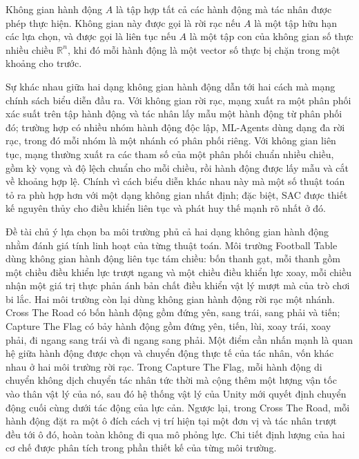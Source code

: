 \begin{dn}
\label{dn:action}
Không gian hành động $A$ là tập hợp tất cả các hành động mà tác nhân được phép thực
hiện. Không gian này được gọi là rời rạc nếu $A$ là một tập hữu hạn các lựa
chọn, và được gọi là liên tục nếu $A$ là một tập con của không gian số thực
nhiều chiều $\mathbb{R}^{n}$, khi đó mỗi hành động là một vector số thực bị chặn trong
một khoảng cho trước.
\end{dn}

\indent Sự khác nhau giữa hai dạng không gian hành động dẫn tới hai cách mà mạng chính
sách biểu diễn đầu ra. Với không gian rời rạc, mạng xuất ra một phân phối xác suất trên
tập hành động và tác nhân lấy mẫu một hành động từ phân phối đó; trường hợp có nhiều
nhóm hành động độc lập, ML-Agents dùng dạng đa rời rạc, trong
đó mỗi nhóm là một nhánh có phân phối riêng. Với không gian liên tục, mạng thường xuất
ra các tham số của một phân phối chuẩn nhiều chiều, gồm kỳ vọng và độ lệch chuẩn cho
mỗi chiều, rồi hành động được lấy mẫu và cắt về khoảng hợp lệ. Chính vì cách biểu diễn
khác nhau này mà một số thuật toán tỏ ra phù hợp hơn với một dạng không gian nhất định;
đặc biệt, SAC được thiết kế nguyên thủy cho điều khiển liên tục và phát huy thế mạnh
rõ nhất ở đó.

\indent Đề tài chủ ý lựa chọn ba môi trường phủ cả hai dạng không gian hành động nhằm
đánh giá tính linh hoạt của từng thuật toán. Môi trường Football Table dùng không gian
hành động liên tục tám chiều: bốn thanh gạt, mỗi thanh gồm một chiều điều khiển
lực trượt ngang và một chiều điều khiển lực xoay, mỗi chiều nhận một giá trị thực phản
ánh bản chất điều khiển vật lý mượt mà của trò chơi bi lắc. Hai môi trường còn lại dùng
không gian hành động rời rạc một nhánh. Cross The Road có bốn hành động gồm đứng
yên, sang trái, sang phải và tiến; Capture The Flag có bảy hành động gồm đứng yên,
tiến, lùi, xoay trái, xoay phải, đi ngang sang trái và đi ngang sang phải. Một điểm cần
nhấn mạnh là quan hệ giữa hành động được chọn và chuyển động thực tế của tác nhân, vốn
khác nhau ở hai môi trường rời rạc. Trong Capture The Flag, mỗi hành động di chuyển
không dịch chuyển tác nhân tức thời mà cộng thêm một lượng vận tốc vào thân vật lý của
nó, sau đó hệ thống vật lý của Unity mới quyết định chuyển động cuối cùng dưới tác động
của lực cản. Ngược lại, trong Cross The Road, mỗi hành động đặt ra một ô đích cách vị
trí hiện tại một đơn vị và tác nhân trượt đều tới ô đó, hoàn toàn không đi qua mô phỏng
lực. Chi tiết định lượng của hai cơ chế được phân tích trong phần thiết kế của từng môi
trường.

